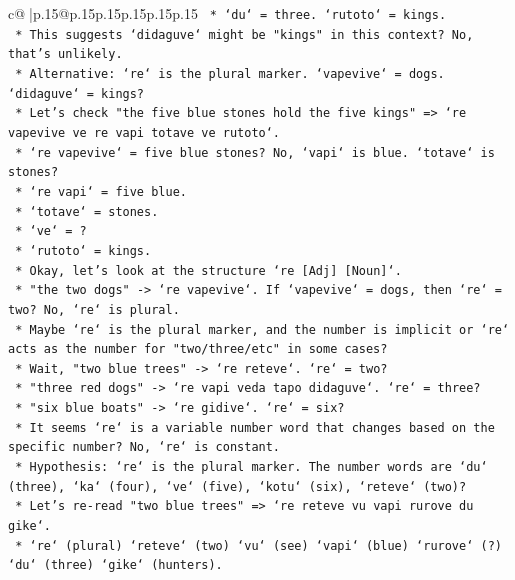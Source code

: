 \documentclass{article}
\begin{document}
{\begin{supertabular}{c@{$\;$}|p{.15\linewidth}@{}p{.15\linewidth}p{.15\linewidth}p{.15\linewidth}p{.15\linewidth}p{.15\linewidth}}
{{{\texttt{                *   `du` = three. `rutoto` = kings.} \\
\texttt{                *   This suggests `didaguve` might be "kings" in this context? No, that's unlikely.} \\
\texttt{                *   Alternative: `re` is the plural marker. `vapevive` = dogs. `didaguve` = kings?} \\
\texttt{                *   Let's check "the five blue stones hold the five kings" => `re vapevive ve re vapi totave ve rutoto`.} \\
\texttt{                    *   `re vapevive` = five blue stones? No, `vapi` is blue. `totave` is stones?} \\
\texttt{                    *   `re vapi` = five blue.} \\
\texttt{                    *   `totave` = stones.} \\
\texttt{                    *   `ve` = ?} \\
\texttt{                    *   `rutoto` = kings.} \\
\texttt{                *   Okay, let's look at the structure `re {[}Adj{]} {[}Noun{]}`.} \\
\texttt{                *   "the two dogs" {-}> `re vapevive`. If `vapevive` = dogs, then `re` = two? No, `re` is plural.} \\
\texttt{                *   Maybe `re` is the plural marker, and the number is implicit or `re` acts as the number for "two/three/etc" in some cases?} \\
\texttt{                *   Wait, "two blue trees" {-}> `re reteve`. `re` = two?} \\
\texttt{                *   "three red dogs" {-}> `re vapi veda tapo didaguve`. `re` = three?} \\
\texttt{                *   "six blue boats" {-}> `re gidive`. `re` = six?} \\
\texttt{                *   It seems `re` is a variable number word that changes based on the specific number? No, `re` is constant.} \\
\texttt{                *   Hypothesis: `re` is the plural marker. The number words are `du` (three), `ka` (four), `ve` (five), `kotu` (six), `reteve` (two)?} \\
\texttt{                *   Let's re{-}read "two blue trees" => `re reteve vu vapi rurove du gike`.} \\
\texttt{                    *   `re` (plural) `reteve` (two) `vu` (see) `vapi` (blue) `rurove` (?) `du` (three) `gike` (hunters).} \\
}}}
\end{supertabular}}
\end{document}
